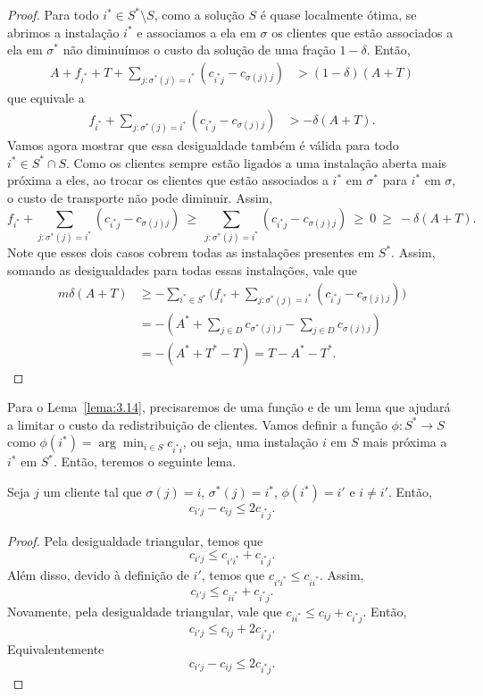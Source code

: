 \begin{proof} 
    Para todo $i^* \in S^* \setminus S$, como a solução $S$ é quase localmente ótima, se abrimos a instalação $i^*$ e associamos a ela em $\sigma$ os clientes que estão associados a ela em $\sigma^*$ não diminuímos o custo da solução de uma fração $1-\delta$. Então,
    \begin{align*} 
      A + f_{i^*} + T + \sum_{j : \sigma^*(j) = i^*} (c_{i^*j} - c_{\sigma(j)j}) &> (1-\delta)(A+T)
    \end{align*} 
que equivale a 
    \begin{align*} 
    f_{i^*} + \sum_{j : \sigma^*(j) = i^*} (c_{i^*j} - c_{\sigma(j)j}) &> -\delta(A+T).
    \end{align*} 
    Vamos agora mostrar que essa desigualdade também é válida para todo $i^* \in S^* \cap S$. Como os clientes sempre estão ligados a uma instalação aberta mais próxima a eles, ao trocar os clientes que estão associados a $i^*$ em $\sigma^*$ para $i^*$ em $\sigma$, o custo de transporte não pode diminuir. Assim, 
    \[ f_{i^*} + \sum_{j : \sigma^*(j) = i^*} (c_{i^*j} - c_{\sigma(j)j}) 
           \ \geq \ \sum_{j : \sigma^*(j) = i^*} (c_{i^*j} - c_{\sigma(j)j})
           \ \geq \ 0 \ \geq \ -\delta(A+T).  \]
    Note que esses dois casos cobrem todas as instalações presentes em $S^*$. Assim, somando as desigualdades para todas essas instalações, vale que
    \begin{subequations}\begin{align*} 
        m\delta(A+T) &\geq  - \sum_{i^* \in S^*}\Big( f_{i^*} + \sum_{j : \sigma^*(j) = i^*} (c_{i^*j} - c_{\sigma(j)j})\Big) \\
        & = -(A^* + \sum_{j \in D} c_{\sigma^*(j)j} - \sum_{j \in D}c_{\sigma(j)j}) \\
        & = - (A^* + T^* - T) = T - A^* - T^*.
    \end{align*}
    \end{subequations}
\end{proof}
Para o Lema~\ref{lema:3.14}, precisaremos de uma função e de um lema que ajudará a limitar o custo da redistribuição de clientes. 
Vamos definir a função ${}\phi : S^* \rightarrow S$ como ${\phi(i^*) = \arg\min_{i \in S} c_{i^*i}}$, ou seja, uma instalação $i$ em $S$ mais próxima a $i^*$ em $S^*$. Então, teremos o seguinte lema.
\begin{lemma}
    \label{lemma:3.8}
    Seja $j$ um cliente tal que $\sigma(j) = i$, $\sigma^*(j) = i^*$, $\phi(i^*) = i'$ e $i\neq i'.$ Então, \[c_{i'j} - c_{ij} \leq 2c_{i^*j}.\]
\end{lemma}
\begin{proof}
    Pela desigualdade triangular, temos que
    \[c_{i'j} \leq c_{i'i^*} + c_{i^*j}.\] Além disso, devido à definição de $i'$, temos que $c_{i'i^*} \leq c_{ii^*}$. Assim,
    \[c_{i'j} \leq c_{ii^*} + c_{i^*j}.\]
    Novamente, pela desigualdade triangular, vale que $c_{ii^*} \leq c_{ij} + c_{i^*j}$. Então,
    \[
        c_{i'j} \leq c_{ij} + 2 c_{i^*j}.
    \] Equivalentemente \[
        c_{i'j} - c_{ij} \leq 2 c_{i^*j}. \]
\end{proof}

